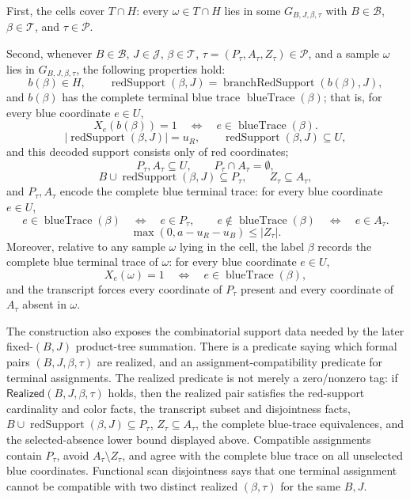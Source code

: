\begin{helper}
First, the cells cover \(T\cap H\): every \(\omega\in T\cap H\) lies in some
\(G_{B,J,\beta,\tau}\) with \(B\in\mathcal B\),
\(\beta\in\mathcal T\), and \(\tau\in\mathcal P\).

Second, whenever \(B\in\mathcal B\), \(J\in\mathcal J\),
\(\beta\in\mathcal T\), \(\tau=(P_\tau,A_\tau,Z_\tau)\in\mathcal P\), and a
sample \(\omega\) lies in \(G_{B,J,\beta,\tau}\), the following properties
hold:
\[
b(\beta)\in H,\qquad
\operatorname{redSupport}(\beta,J)
  =\operatorname{branchRedSupport}(b(\beta),J),
\]
and \(b(\beta)\) has the complete terminal blue trace
\(\operatorname{blueTrace}(\beta)\); that is, for every blue coordinate
\(e\in U\),
\[
X_e(b(\beta))=1
  \quad\Longleftrightarrow\quad
e\in\operatorname{blueTrace}(\beta).
\]
\[
|\operatorname{redSupport}(\beta,J)|=u_R,\qquad
\operatorname{redSupport}(\beta,J)\subseteq U,
\]
and this decoded support consists only of red coordinates;
\[
P_\tau,A_\tau\subseteq U,\qquad P_\tau\cap A_\tau=\emptyset,
\]
\[
B\cup\operatorname{redSupport}(\beta,J)\subseteq P_\tau,\qquad
Z_\tau\subseteq A_\tau,
\]
and \(P_\tau,A_\tau\) encode the complete blue terminal trace:
for every blue coordinate \(e\in U\),
\[
e\in\operatorname{blueTrace}(\beta)\quad\Longleftrightarrow\quad
e\in P_\tau,
\qquad
e\notin\operatorname{blueTrace}(\beta)\quad\Longleftrightarrow\quad
e\in A_\tau .
\]
\[
\max(0,a-u_R-u_B)\le |Z_\tau|.
\]
Moreover, relative to any sample \(\omega\) lying in the cell, the label
\(\beta\) records the complete blue terminal trace of \(\omega\): for every
blue coordinate \(e\in U\),
\[
X_e(\omega)=1
  \quad\Longleftrightarrow\quad
e\in\operatorname{blueTrace}(\beta),
\]
and the transcript forces every coordinate of \(P_\tau\) present and every
coordinate of \(A_\tau\) absent in \(\omega\).

The construction also exposes the combinatorial support data needed by the
later fixed-\((B,J)\) product-tree summation.  There is a predicate saying
which formal pairs \((B,J,\beta,\tau)\) are realized, and an
assignment-compatibility predicate for terminal assignments.  The realized
predicate is not merely a zero/nonzero tag: if
\(\mathsf{Realized}(B,J,\beta,\tau)\) holds, then the realized pair satisfies
the red-support cardinality and color facts, the transcript subset and
disjointness facts, \(B\cup\operatorname{redSupport}(\beta,J)\subseteq
P_\tau\), \(Z_\tau\subseteq A_\tau\), the complete blue-trace equivalences,
and the selected-absence lower bound displayed above.  Compatible
assignments contain \(P_\tau\), avoid \(A_\tau\setminus Z_\tau\), and agree
with the complete blue trace on all unselected blue coordinates.  Functional
scan disjointness says that one terminal assignment cannot be compatible
with two distinct realized \((\beta,\tau)\) for the same \(B,J\).


\end{helper}
